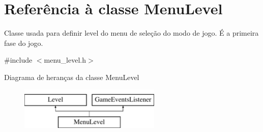 \hypertarget{classMenuLevel}{}\section{Referência à classe Menu\+Level}
\label{classMenuLevel}


Classe usada para definir level do menu de seleção do modo de jogo. É a primeira fase do jogo.  




{\ttfamily \#include $<$menu\+\_\+level.\+h$>$}

Diagrama de heranças da classe Menu\+Level\begin{figure}[H]
\begin{center}
\leavevmode
\includegraphics[height=2.000000cm]{classMenuLevel}
\end{center}
\end{figure}
